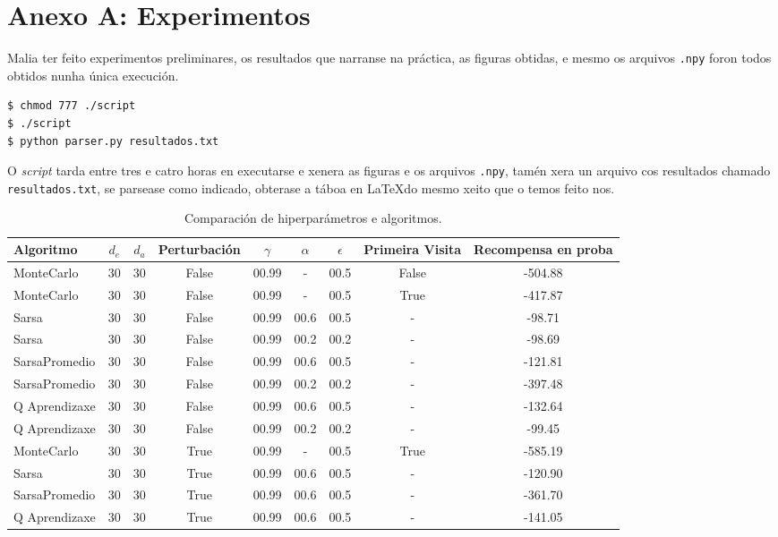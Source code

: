 \documentclass{article}
\begin{document}
\newpage

\section*{Anexo A: Experimentos}

Malia ter feito experimentos preliminares, os resultados que narranse na práctica, as figuras obtidas, e mesmo os arquivos \texttt{.npy} foron todos obtidos nunha única execución. 

\begin{tcolorbox}[colback=black!5!white, colframe=black!75!white, title=Reproducir a táboa de debaixo]
\begin{lstlisting}[basicstyle=\ttfamily\small]
$ chmod 777 ./script
$ ./script
$ python parser.py resultados.txt
\end{lstlisting}
\end{tcolorbox}


O \emph{script} tarda entre tres e catro horas en executarse e xenera as figuras e os arquivos \texttt{.npy}, tamén xera un arquivo cos resultados chamado \texttt{resultados.txt}, se parsease como indicado, obterase a táboa en \LaTeX do mesmo xeito que o temos feito nos.

\begin{table}[ht]
\centering
\begin{tabular}{|l|c|c|c|c|c|c|c|c|}
\hline
Algoritmo & $d_e$ & $d_a$ & Perturbación & $\gamma$ & $\alpha$ & $\epsilon$ & Primeira Visita & Recompensa en proba \\ \hline
MonteCarlo & 30 & 30 & False & 00.99 & - & 00.5 & False & -504.88 \\ \hline
MonteCarlo & 30 & 30 & False & 00.99 & - & 00.5 & True & -417.87 \\ \hline
Sarsa & 30 & 30 & False & 00.99 & 00.6 & 00.5 & - & -98.71 \\ \hline
Sarsa & 30 & 30 & False & 00.99 & 00.2 & 00.2 & - & -98.69 \\ \hline
SarsaPromedio & 30 & 30 & False & 00.99 & 00.6 & 00.5 & - & -121.81 \\ \hline
SarsaPromedio & 30 & 30 & False & 00.99 & 00.2 & 00.2 & - & -397.48 \\ \hline
Q Aprendizaxe & 30 & 30 & False & 00.99 & 00.6 & 00.5 & - & -132.64 \\ \hline
Q Aprendizaxe & 30 & 30 & False & 00.99 & 00.2 & 00.2 & - & -99.45 \\ \hline
MonteCarlo & 30 & 30 & True & 00.99 & - & 00.5 & True & -585.19 \\ \hline
Sarsa & 30 & 30 & True & 00.99 & 00.6 & 00.5 & - & -120.90 \\ \hline
SarsaPromedio & 30 & 30 & True & 00.99 & 00.6 & 00.5 & - & -361.70 \\ \hline
Q Aprendizaxe & 30 & 30 & True & 00.99 & 00.6 & 00.5 & - & -141.05 \\ \hline
\end{tabular}
\caption{Comparación de hiperparámetros e algoritmos.}
\label{tab:rl_algorithms}
\end{table}
\end{document}
